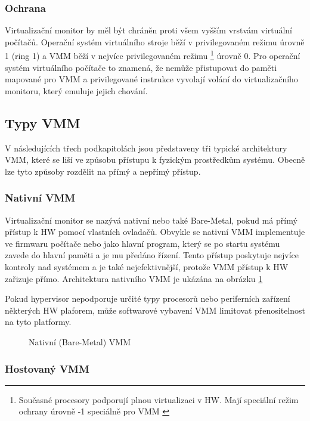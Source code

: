 \subsubsection*{Ochrana}

Virtualizační monitor by měl být chráněn proti všem vyšším vrstvám virtuální počítačů. Operační systém virtuálního stroje běží v privilegovaném režimu úrovně 1 (ring 1) a VMM běží v nejvíce privilegovaném režimu \footnote[1]{Současné procesory podporují plnou virtualizaci v HW. Mají speciální 
režim ochrany úrovně -1 speciálně pro VMM \cite{virt2}} úrovně 0. Pro operační systém virtuálního počítače to znamená, že nemůže přistupovat do paměti mapované pro VMM a privilegované instrukce vyvolají volání do virtualizačního monitoru, který emuluje jejich chování. 


\subsection{Typy VMM}

V následujících třech podkapitolách jsou představeny tři typické architektury VMM, které se liší ve způsobu přístupu k fyzickým prostředkům systému. Obecně lze tyto způsoby rozdělit na přímý a nepřímý přístup.

\subsubsection*{Nativní VMM}

Virtualizační monitor se nazývá nativní nebo také Bare-Metal, pokud má přímý přístup k HW pomocí vlastních ovladačů. Obvykle se nativní VMM implementuje ve firmwaru počítače nebo jako hlavní program, který se po startu
systému  zavede do hlavní paměti a je mu předáno řízení. Tento přístup poskytuje nejvíce kontroly nad systémem a je také nejefektivnější, protože VMM přístup k HW zařizuje přímo. Architektura nativního VMM je ukázána na 
obrázku \ref{native_vmm}

Pokud hypervisor nepodporuje určité typy procesorů nebo periferních zařízení některých HW plaforem, může softwarové vybavení VMM limitovat přenositelnost na tyto platformy.\cite{vmm1}

\begin{figure}
    \centering    
    \caption{Nativní (Bare-Metal) VMM}
    \label{native_vmm}
\end{figure}

\subsubsection*{Hostovaný VMM}

